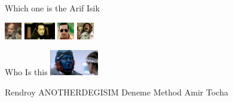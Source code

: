 \documentclass{exam}
\begin{document}
\begin{questions}
\question Which one is the Arif Isik\newline
\begin{oneparchoices}
\choice \includegraphics[height=2em]{216.jpg}
\choice \includegraphics[height=2em]{komutanlogar.jpeg}
\choice \includegraphics[height=2em]{arifisik.jpg}
\choice \includegraphics[height=2em]{faruk.jpg}
\end{oneparchoices}
\question Who Is this\newline
\includegraphics[height=3em]{rendroy2.jpg} \newline
\begin{oneparchoices}
\choice Rendroy
\choice ANOTHERDEGISIM
\choice Deneme Method
\choice Amir Tocha
\end{oneparchoices}
\end{questions}
\end{document}
